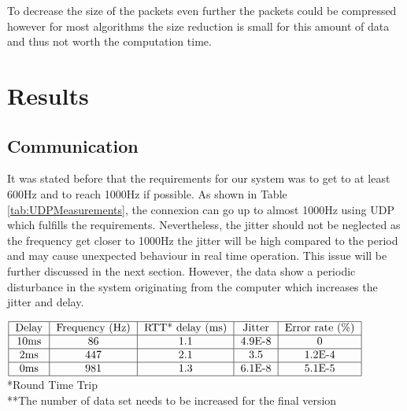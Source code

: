 \documentclass[conference]{IEEEtran}
\begin{document}
To decrease the size of the packets even further the packets could be compressed however for most algorithms the size reduction is small for this amount of data and thus not worth the computation time.


\section{Results}

\subsection{Communication}

 It was stated before that the requirements for our system was to get to at least 600Hz and to reach 1000Hz if possible. As shown in Table \ref{tab:UDPMeasurements}, the connexion can go up to almost 1000Hz using UDP which fulfills the requirements. Nevertheless, the jitter should not be neglected as the frequency get closer to 1000Hz the jitter will be high compared to the period and may cause unexpected behaviour in real time operation. This issue will be further discussed in the next section. However, the data show a periodic disturbance in the system originating from the computer which increases the jitter and delay. %


\begin{table}[!t]
  $\begin{tabular}{|c|c|c|c|c|c|}
    \hline
    \text{Delay} & \text{Frequency (Hz)} & \text{RTT* delay (ms)} & \text{Jitter} & \text{Error rate (\%)}\\
    \hline
    10ms & 86 & 1.1 & 4.9E-8 & 0 \\
    \hline
    2ms & 447 & 2.1 & 3.5 & 1.2E-4 \\
    \hline
    0ms & 981 & 1.3 & 6.1E-8 & 5.1E-5 \\
    \hline
  \end{tabular}$
  *Round Time Trip\\
  **The number of data set needs to be increased for the final version
  \caption{UDP**}
  \label{tab:UDPMeasurements}
\end{table}
\end{document}
